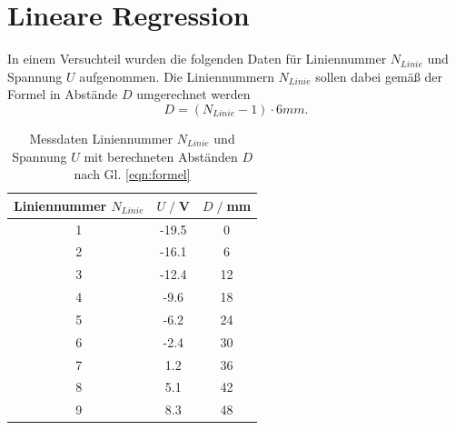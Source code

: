 \section{Lineare Regression}
    In einem Versuchteil wurden die folgenden Daten für Liniennummer $N_{Linie}$
    und Spannung $U$ aufgenommen.
    Die Liniennummern $N_{Linie}$ sollen dabei gemäß der Formel in Abstände $D$ umgerechnet werden 
    \begin{equation}
        D=(N_{Linie}-1) \cdot 6 \si{mm.}
        \label{eqn:formel}
    \end{equation}

    \begin{table}[H]
        \centering
        \begin{tabular}{c c c}
            \toprule
            Liniennummer $N_{Linie}$ & $U\;/\;$V & $D\;/\;$mm \\
            \midrule
            1&-19.5&0\\
            2&-16.1&6\\
            3&-12.4&12\\
            4&-9.6&18\\
            5&-6.2&24\\
            6&-2.4&30\\
            7&1.2&36\\
            8&5.1&42\\
            9&8.3&48\\
            \bottomrule
        \end{tabular}
        \caption{Messdaten Liniennummer $N_{Linie}$ und Spannung $U$ mit berechneten
            Abständen $D$ nach Gl. \ref{eqn:formel}}
        \label{tab:tabelle}
    \end{table}

